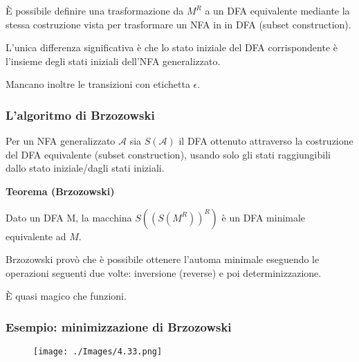 \vspace{5mm}

È possibile definire una trasformazione da $M^{R}$ a un DFA equivalente mediante la stessa costruzione vista per trasformare un NFA in in DFA (subset construction).

L'unica differenza significativa è che lo stato iniziale del DFA corrispondente è l'insieme degli stati iniziali dell'NFA generalizzato.

Mancano inoltre le transizioni con etichetta $\epsilon$.

\subsubsection{L'algoritmo di Brzozowski}

Per un NFA generalizzato $\mathcal{A}$ sia $S(\mathcal{A})$ il DFA ottenuto attraverso la costruzione del DFA equivalente (subset construction), usando solo gli stati raggiungibili dallo stato iniziale/dagli stati iniziali.

\vspace{5mm}

\textbf{Teorema (Brzozowski)}

Dato un DFA M, la macchina
$S\left(\left(S\left(M^{R}\right)\right)^{R}\right)$
è un DFA minimale equivalente ad $M$.

Brzozowski provò che è possibile ottenere l'automa minimale
eseguendo le operazioni seguenti due volte: inversione (reverse) e poi
determinizzazione.

È quasi magico che funzioni.

\subsubsection{Esempio: minimizzazione di Brzozowski}

\begin{figure}[hbpt!]
    \centering
    \texttt{[image: ./Images/4.33.png]}
\end{figure}
\FloatBarrier


